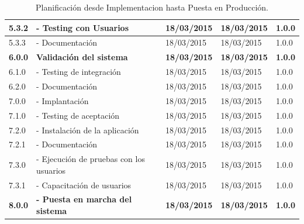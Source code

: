 \documentclass[12pt,letterpaper]{article}
\begin{document}
\begin{table}[htf]
\begin{tabular}{| l | p{6cm} | l | l | l |}
\small 5.3.2 & 
\small - Testing con Usuarios & 
\small 18/03/2015 &  
\small 18/03/2015 & 
\small 1.0.0 \\ \hline

\small 5.3.3 & 
\small - Documentación & 
\small 18/03/2015 &  
\small 18/03/2015 & 
\small 1.0.0 \\ \hline

\textbf{\small 6.0.0} & 
\textbf{\small Validación del sistema} & 
\textbf{\small 18/03/2015} &  
\textbf{\small 18/03/2015} & 
\textbf{\small 1.0.0} \\ \hline

\small 6.1.0 & 
\small - Testing de integración & 
\small 18/03/2015 &  
\small 18/03/2015 & 
\small 1.0.0 \\ \hline

\small 6.2.0 & 
\small - Documentación & 
\small 18/03/2015 &  
\small 18/03/2015 & 
\small 1.0.0 \\ \hline

\small 7.0.0 & 
\small - Implantación  & 
\small 18/03/2015 &  
\small 18/03/2015 & 
\small 1.0.0 \\ \hline

\small 7.1.0 & 
\small - Testing de aceptación  & 
\small 18/03/2015 &  
\small 18/03/2015 & 
\small 1.0.0 \\ \hline

\small 7.2.0 & 
\small - Instalación de la aplicación  & 
\small 18/03/2015 &  
\small 18/03/2015 & 
\small 1.0.0 \\ \hline

\small 7.2.1 & 
\small - Documentación  & 
\small 18/03/2015 &  
\small 18/03/2015 & 
\small 1.0.0 \\ \hline

\small 7.3.0 & 
\small - Ejecución de pruebas con los usuarios & 
\small 18/03/2015 &  
\small 18/03/2015 & 
\small 1.0.0 \\ \hline

\small 7.3.1 & 
\small - Capacitación de usuarios & 
\small 18/03/2015 &  
\small 18/03/2015 & 
\small 1.0.0 \\ \hline


\textbf{\small 8.0.0 }& 
\textbf{\small - Puesta en marcha del sistema} & 
\textbf{\small 18/03/2015 }&  
\textbf{\small 18/03/2015} & 
\textbf{\small 1.0.0} \\ \hline



\hline
\end{tabular}
\caption{Planificación desde Implementacion hasta Puesta en Producción.}
\end{table}
\end{document}
